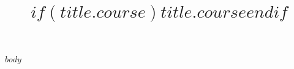 \documentclass[12pt,ignorenonframetext,aspectratio=169]{beamer}
\title[$if(title.lecture)$$title.lecture$$endif$]{$if(title.course)$$title.course$$endif$}
\institute[University of North Texas]{
	\normalsize{University of North Texas\\ 
		Department of Political Science}
}
\begin{document}
	
	\begin{frame}
		\maketitle
	\end{frame}

$body$
\end{document}
